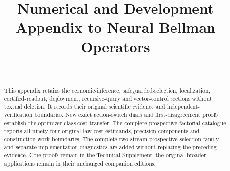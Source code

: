 \documentclass[ecta,nameyear,draft]{econsocart}
\begin{document}
\begin{frontmatter}
\title{Numerical and Development Appendix to Neural Bellman Operators}
\begin{aug}
\author[id=au1,addressref={add1}]{~}
\address[id=add1]{Peking University}
\end{aug}
\begin{abstract}
This appendix retains the economic-inference, safeguarded-selection, localization, certified-readout, deployment, recursive-query and vector-control sections without textual deletion. It records their original scientific evidence and independent-verification boundaries. New exact action-switch duals and first-disagreement proofs establish the optimizer-class cost transfer. The complete prospective factorial catalogue reports all ninety-four original-law cost estimands, precision components and construction-work boundaries. The complete two-stream prospective selection family and separate implementation diagnostics are added without replacing the preceding evidence. Core proofs remain in the Technical Supplement; the original broader applications remain in their unchanged companion editions.
\end{abstract}
\end{frontmatter}
\appendix
\renewcommand{\thesection}{\AlphAlph{\value{section}}}




























\end{document}
